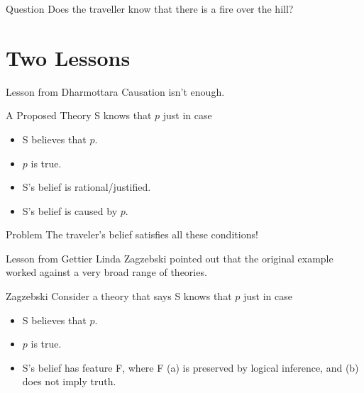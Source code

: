 \documentclass[
  17pt,
  letterpaper,
  ignorenonframetext,
  aspectratio=169,
  handout]{beamer}
\providecommand{\tightlist}{%
  \setlength{\itemsep}{0pt}\setlength{\parskip}{0pt}}\usepackage{longtable,booktabs,array}
\begin{document}
\begin{frame}{Question}
\protect\hypertarget{question-1}{}
Does the traveller know that there is a fire over the hill?
\end{frame}

\hypertarget{two-lessons}{%
\section{Two Lessons}\label{two-lessons}}

\begin{frame}{Lesson from Dharmottara}
\protect\hypertarget{lesson-from-dharmottara}{}
Causation isn't enough.
\end{frame}

\begin{frame}{A Proposed Theory}
\protect\hypertarget{a-proposed-theory}{}
S knows that \(p\) just in case

\begin{itemize}[<+->]
\tightlist
\item
  S believes that \(p\).
\item
  \(p\) is true.
\item
  S's belief is rational/justified.
\item
  S's belief is caused by \(p\).
\end{itemize}
\end{frame}

\begin{frame}{Problem}
\protect\hypertarget{problem}{}
The traveler's belief satisfies all these conditions!
\end{frame}

\begin{frame}{Lesson from Gettier}
\protect\hypertarget{lesson-from-gettier}{}
Linda Zagzebski pointed out that the original example worked against a
very broad range of theories.
\end{frame}

\begin{frame}{Zagzebski}
\protect\hypertarget{zagzebski}{}
Consider a theory that says S knows that \(p\) just in case

\begin{itemize}[<+->]
\tightlist
\item
  S believes that \(p\).
\item
  \(p\) is true.
\item
  S's belief has feature F, where F (a) is preserved by logical
  inference, and (b) does not imply truth.
\end{itemize}
\end{frame}
\end{document}
